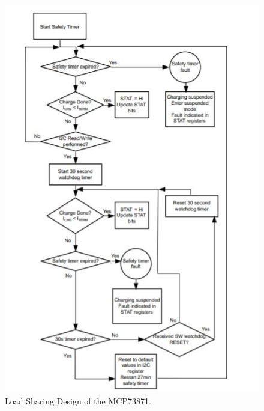 \begin{figure}
    \centering
    \includegraphics[scale=.85]{figures/watchdog-flowchart.JPG}
    \caption{Load Sharing Design of the MCP73871.}
    \label{fig:watchdog-flow} 
\end{figure}

